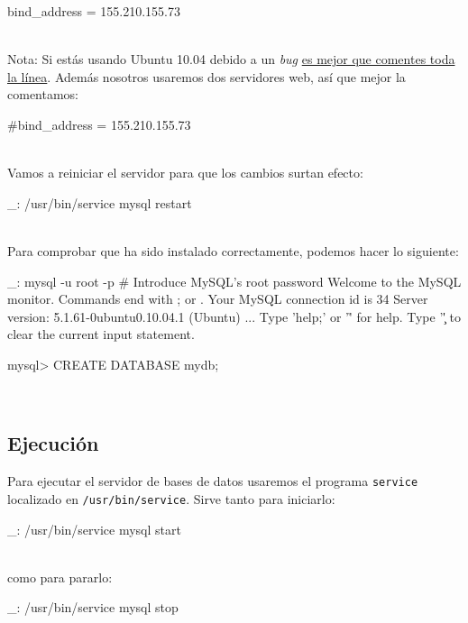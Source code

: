 \begin{bashcode}
bind_address = 155.210.155.73
\end{bashcode}
\\

Nota: Si estás usando Ubuntu 10.04 debido a un \emph{bug} \href{http://ubuntuforums.org/showthread.php?t=1479310}{es mejor que comentes toda la línea}. Además nosotros usaremos dos servidores web, así que mejor la comentamos:

\begin{bashcode}
#bind_address = 155.210.155.73
\end{bashcode}
\\

Vamos a reiniciar el servidor para que los cambios surtan efecto:

\begin{bashcode}
_: /usr/bin/service mysql restart
\end{bashcode}
\\

Para comprobar que ha sido instalado correctamente, podemos hacer lo siguiente:

\begin{bashcode}
_: mysql -u root -p     # Introduce MySQL's root password
Welcome to the MySQL monitor.  Commands end with ; or \g.
Your MySQL connection id is 34
Server version: 5.1.61-0ubuntu0.10.04.1 (Ubuntu)
...
Type 'help;' or '\h' for help. Type '\c' to clear the current input statement.

mysql> CREATE DATABASE mydb;
\end{bashcode}
\\


\subsection{Ejecución}

Para ejecutar el servidor de bases de datos usaremos el programa \texttt{service} localizado en \texttt{/usr/bin/service}. Sirve tanto para iniciarlo:

\begin{bashcode}
_: /usr/bin/service mysql start
\end{bashcode}
\\

como para pararlo:
\begin{bashcode}
_: /usr/bin/service mysql stop
\end{bashcode}
\\


